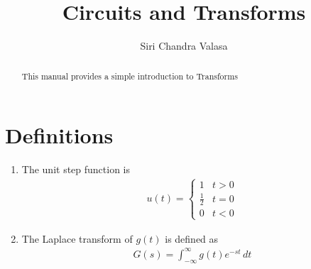 \documentclass[journal,12pt,twocolumn]{IEEEtran}
\renewcommand\thesection{\arabic{section}}
\begin{document}
\makeatletter
{}
\makeatother
\let\StandardTheFigure\thefigure
\renewcommand{\thefigure}{\theproblem}
\def\putbox#1#2#3{\makebox[0in][l]{\makebox[#1][l]{}\raisebox{\baselineskip}[0in][0in]{\raisebox{#2}[0in][0in]{#3}}}}
\def\rightbox#1{\makebox[0in][r]{#1}}
\def\centbox#1{\makebox[0in]{#1}}
\def\topbox#1{\raisebox{-\baselineskip}[0in][0in]{#1}}
\def\midbox#1{\raisebox{-0.5\baselineskip}[0in][0in]{#1}}
\vspace{3cm}
\title{
Circuits and Transforms
}

\author{ Siri Chandra Valasa
}

\maketitle
\tableofcontents
\renewcommand{\thefigure}{\theenumi}
\renewcommand{\thetable}{\theenumi}
\bigskip
\begin{abstract}
This manual provides a simple introduction to Transforms
\end{abstract}
\section{Definitions}
\begin{enumerate}[label=\arabic*.,ref=\thesection.\theenumi]
\item The unit step function is
\begin{align}
u(t) =
\begin{cases}
1 & t > 0
\\
\frac{1}{2} & t = 0
\\
0 & t < 0
\end{cases}
\end{align}
\item The Laplace transform of $g(t)$ is defined as
\begin{align}
G(s) = \int_{-\infty}^{\infty} g(t) e^{-st}\, dt
\end{align}
\end{enumerate}
\end{document}
